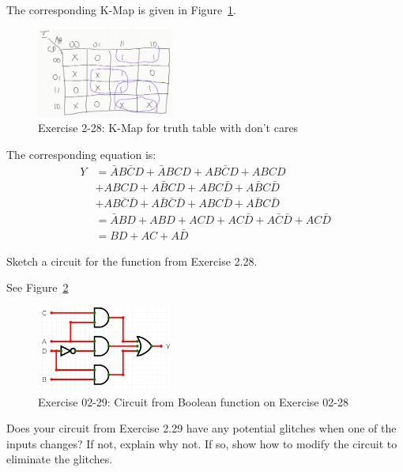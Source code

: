 \documentclass[12pt]{article}
\newenvironment{ex}[2][Exercise]{\begin{trivlist}
		\item[\hskip \labelsep {\bfseries #1}\hskip \labelsep {\bfseries #2.}]}{\end{trivlist}}
\newenvironment{sol}[1][Solution]{\begin{trivlist}
		\item[\hskip \labelsep {\bfseries #1:}]}{\end{trivlist}}
\begin{document}
\begin{sol}
	The corresponding K-Map is given in Figure~\ref{02-29-kmap-with-dont-cares}.
	\begin{figure}
		\centering
		\includegraphics[width=0.4\textwidth]{02-29-kmap-with-dont-cares}
		\caption{Exercise 2-28: K-Map for truth table with don't cares}
		\label{02-29-kmap-with-dont-cares}
	\end{figure}
	The corresponding equation is:
	\begin{align*}
		Y&=\bar{A}B\bar{C}D+\bar{A}BCD+AB\bar{C}D+ABCD\\
		&+ABCD+A\bar{B}CD+ABC\bar{D}+A\bar{B}C\bar{D}\\
		&+AB\bar{C}\bar{D}+A\bar{B}\bar{C}\bar{D}+ABC\bar{D}+A\bar{B}C\bar{D}\\
		&=\bar{A}BD+ABD
		+ACD+AC\bar{D}
		+A\bar{C}\bar{D}+AC\bar{D}\\
		&=BD+AC+A\bar{D}
	\end{align*}
\end{sol}

\begin{ex}{2.29}
	Sketch a circuit for the function from Exercise 2.28.
\end{ex}

\begin{sol}
	See Figure~\ref{02-29circuit}
	\begin{figure}
		\centering
		\includegraphics[width=0.4\textwidth]{02-29-circuit}
		\caption{Exercise 02-29: Circuit from Boolean function on Exercise 02-28}
		\label{02-29circuit}
	\end{figure}
\end{sol}

\begin{ex}{2.30}
	Does your circuit from Exercise 2.29 have any potential glitches when one of the inputs changes?
	If not, explain why not. If so, show how to
	modify the circuit to eliminate the glitches.
\end{ex}
\end{document}
